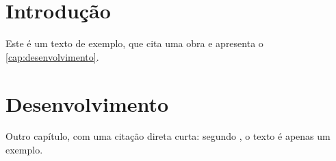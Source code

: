 \documentclass[12pt, a4paper, oneside, brazilian]{abntex2}
\begin{document}
\imprimirtitulo

\tableofcontents*

\chapter{Introdução}

Este é um texto de exemplo, que cita uma obra \cite{exemplo2020} e apresenta o
\autoref{cap:desenvolvimento}.

\chapter{Desenvolvimento}\label{cap:desenvolvimento}

Outro capítulo, com uma citação direta curta: segundo \textcite{exemplo2020}, o texto é
apenas um exemplo.

\printbibliography
\end{document}
